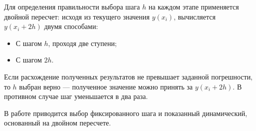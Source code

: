 Для определения правильности выбора шага \(h\) на каждом этапе применяется двойной пересчет: исходя из текущего значения \(y(x_i)\), вычисляется \(y(x_i + 2h)\) двумя способами:
\begin{itemize}
	\item С шагом \(h\), проходя две ступени;
	\item С шагом \(2h\).
\end{itemize}
Если расхождение полученных результатов не превышает заданной погрешности, то \(h\) выбран верно --- полученное значение можно принять за \(y(x_i + 2h)\). В противном случае шаг уменьшается в два раза.

В работе приводится выбор фиксированного шага и показанный динамический, основанный на двойном пересчете.
